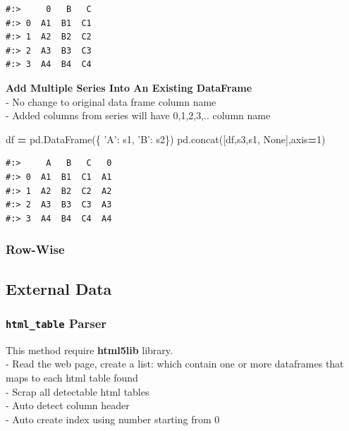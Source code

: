 \documentclass[
]{book}
\newenvironment{Shaded}{\begin{snugshade}}{\end{snugshade}}
\newcommand{\DecValTok}[1]{\textcolor[rgb]{0.06,0.06,0.06}{#1}}
\newcommand{\NormalTok}[1]{#1}
\newcommand{\OperatorTok}[1]{\textcolor[rgb]{0.43,0.43,0.43}{\textbf{#1}}}
\newcommand{\StringTok}[1]{\textcolor[rgb]{0.5,0.5,0.5}{#1}}
\newcommand{\VariableTok}[1]{\textcolor[rgb]{0,0,0}{#1}}
\begin{document}
\begin{verbatim}
#:>     0   B   C
#:> 0  A1  B1  C1
#:> 1  A2  B2  C2
#:> 2  A3  B3  C3
#:> 3  A4  B4  C4
\end{verbatim}

\textbf{Add Multiple Series Into An Existing DataFrame}\\
- No change to original data frame column name\\
- Added columns from series will have 0,1,2,3,.. column name

\begin{Shaded}
\begin{Highlighting}[]
\NormalTok{df }\OperatorTok{=}\NormalTok{ pd.DataFrame(\{ }\StringTok{'A'}\NormalTok{: s1, }\StringTok{'B'}\NormalTok{: s2\})}
\NormalTok{pd.concat([df,s3,s1, }\VariableTok{None}\NormalTok{],axis}\OperatorTok{=}\DecValTok{1}\NormalTok{)}
\end{Highlighting}
\end{Shaded}

\begin{verbatim}
#:>     A   B   C   0
#:> 0  A1  B1  C1  A1
#:> 1  A2  B2  C2  A2
#:> 2  A3  B3  C3  A3
#:> 3  A4  B4  C4  A4
\end{verbatim}

\hypertarget{row-wise}{%
\subsubsection{Row-Wise}\label{row-wise}}

\hypertarget{external-data}{%
\subsection{External Data}\label{external-data}}

\hypertarget{html_table-parser}{%
\subsubsection{\texorpdfstring{\texttt{html\_table} Parser}{html\_table Parser}}\label{html_table-parser}}

This method require \textbf{html5lib} library.\\
- Read the web page, create a list: which contain one or more dataframes that maps to each html table found\\
- Scrap all detectable html tables\\
- Auto detect column header\\
- Auto create index using number starting from 0
\end{document}
